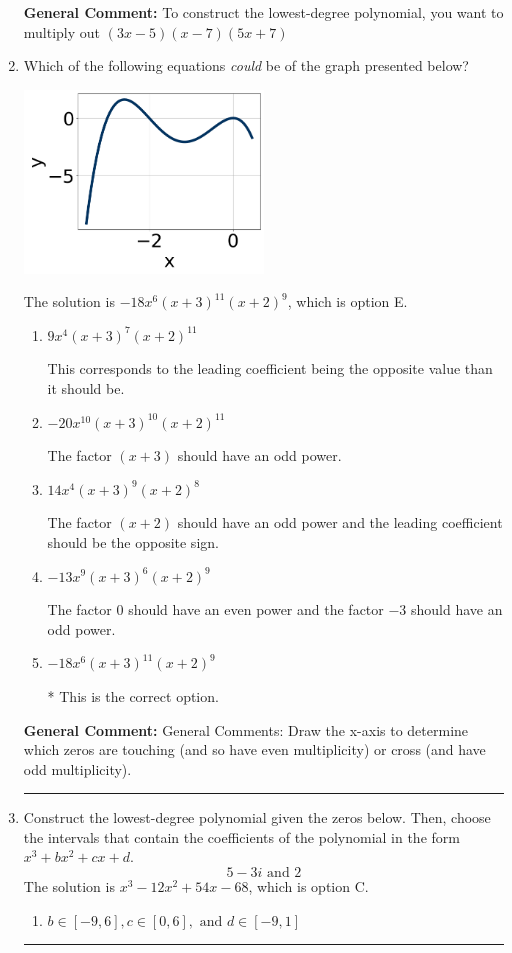\documentclass{extbook}[14pt]
\newcommand{\litem}[1]{\item #1

\rule{\textwidth}{0.4pt}}
\begin{document}
\begin{enumerate}
{\textbf{General Comment:} To construct the lowest-degree polynomial, you want to multiply out $(3x -5)(x -7)(5x + 7)$
}
\litem{
Which of the following equations \textit{could} be of the graph presented below?

\begin{center}
    \includegraphics[width=0.5\textwidth]{../Figures/polyGraphToFunctionCopyA.png}
\end{center}


The solution is \( -18x^{6} (x + 3)^{11} (x + 2)^{9} \), which is option E.\begin{enumerate}[label=\Alph*.]
\item \( 9x^{4} (x + 3)^{7} (x + 2)^{11} \)

This corresponds to the leading coefficient being the opposite value than it should be.
\item \( -20x^{10} (x + 3)^{10} (x + 2)^{11} \)

The factor $(x + 3)$ should have an odd power.
\item \( 14x^{4} (x + 3)^{9} (x + 2)^{8} \)

The factor $(x + 2)$ should have an odd power and the leading coefficient should be the opposite sign.
\item \( -13x^{9} (x + 3)^{6} (x + 2)^{9} \)

The factor $0$ should have an even power and the factor $-3$ should have an odd power.
\item \( -18x^{6} (x + 3)^{11} (x + 2)^{9} \)

* This is the correct option.
\end{enumerate}

\textbf{General Comment:} General Comments: Draw the x-axis to determine which zeros are touching (and so have even multiplicity) or cross (and have odd multiplicity).
}
\litem{
Construct the lowest-degree polynomial given the zeros below. Then, choose the intervals that contain the coefficients of the polynomial in the form $x^3+bx^2+cx+d$.
\[ 5 - 3 i \text{ and } 2 \]The solution is \( x^{3} -12 x^{2} +54 x -68 \), which is option C.\begin{enumerate}[label=\Alph*.]
\item \( b \in [-9, 6], c \in [0, 6], \text{ and } d \in [-9, 1] \)


\end{enumerate}}
\end{enumerate}
\end{document}

